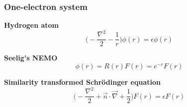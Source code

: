 \begin{frame}
\frametitle{One-electron system}
\centering

\textbf{Hydrogen atom}
\begin{equation}
    \nonumber
    \bigg(-\frac{\nabla^2}{2} - \frac{1}{r} \bigg)\phi(r) = \epsilon \phi(r)
\end{equation}

\pause
\vspace{10mm}

\textbf{Seelig's NEMO}
\begin{equation}
    \nonumber
    \phi(r) = R(r)F(r) = e^{-r}F(r)
\end{equation}

\pause
\vspace{10mm}

\textbf{Similarity transformed Schr\"{o}dinger equation}
\begin{equation}
    \nonumber
    \bigg(-\frac{\nabla^2}{2} + \vec{n}\cdot\vec{\nabla} + \frac{1}{2}\bigg)F(r) =
    \epsilon F(r)
\end{equation}

\end{frame}

